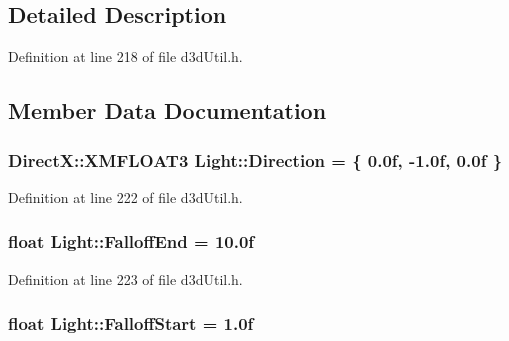 \subsection{Detailed Description}


Definition at line 218 of file d3d\+Util.\+h.



\subsection{Member Data Documentation}
\subsubsection[{\texorpdfstring{Direction}{Direction}}]{\setlength{\rightskip}{0pt plus 5cm}Direct\+X\+::\+X\+M\+F\+L\+O\+A\+T3 Light\+::\+Direction = \{ 0.\+0f, -\/1.\+0f, 0.\+0f \}}\hypertarget{struct_light_afd9b6884af30b8fdc7fee9a982572a0f_afd9b6884af30b8fdc7fee9a982572a0f}{}\label{struct_light_afd9b6884af30b8fdc7fee9a982572a0f_afd9b6884af30b8fdc7fee9a982572a0f}


Definition at line 222 of file d3d\+Util.\+h.

\subsubsection[{\texorpdfstring{Falloff\+End}{FalloffEnd}}]{\setlength{\rightskip}{0pt plus 5cm}float Light\+::\+Falloff\+End = 10.\+0f}\hypertarget{struct_light_a38fa90b8cea6b266b13c3dc865828a14_a38fa90b8cea6b266b13c3dc865828a14}{}\label{struct_light_a38fa90b8cea6b266b13c3dc865828a14_a38fa90b8cea6b266b13c3dc865828a14}


Definition at line 223 of file d3d\+Util.\+h.

\subsubsection[{\texorpdfstring{Falloff\+Start}{FalloffStart}}]{\setlength{\rightskip}{0pt plus 5cm}float Light\+::\+Falloff\+Start = 1.\+0f}\hypertarget{struct_light_a21cc24ec9f914edbbc090bb3460fc645_a21cc24ec9f914edbbc090bb3460fc645}{}\label{struct_light_a21cc24ec9f914edbbc090bb3460fc645_a21cc24ec9f914edbbc090bb3460fc645}


